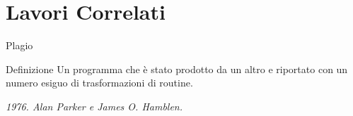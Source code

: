 \documentclass{beamer}
\newcommand\tab[1][1cm]{\hspace*{#1}}	%
\begin{document}
	

	\section{Lavori Correlati}
	
	\begin{frame}{Plagio}
		\begin{alertblock}{Definizione}
			Un programma che è stato prodotto da un altro e riportato con un numero esiguo di trasformazioni di routine.
			
			\hspace{4cm}\textit{1976. Alan Parker e James O. Hamblen.}
		\end{alertblock}
		
		\vspace{-0.5cm}
		\begin{center}
		\end{center}
	\end{frame}

\end{document}
